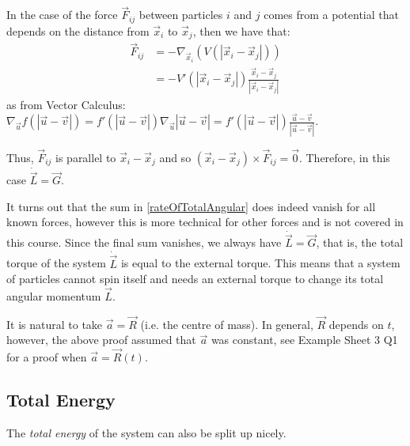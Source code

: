 \documentclass[../main.tex]{subfiles}
\begin{document}
In the case of the force $\vec{F}_{i j}$ between particles $i$ and $j$ comes from a potential that depends on the distance from $\vec{x}_i$ to $\vec{x}_j$, then we have that:
\begin{align*}
  \vec{F}_{i j} &= -\nabla_{\vec{x}_i} (V(|\vec{x}_i - \vec{x}_j|)) \\
                &= -V' (|\vec{x}_i - \vec{x}_j|) \frac{\vec{x}_i - \vec{x}_j}{|\vec{x}_i - \vec{x}_j|}
\end{align*}
as from Vector Calculus: $\nabla_{\vec{u}} f(|\vec{u} - \vec{v}|) = f'(|\vec{u} - \vec{v}|) \nabla_{\vec{u}} |\vec{u} - \vec{v}| = f'(|\vec{u} - \vec{v}|) \frac{\vec{u} - \vec{v}}{|\vec{u} - \vec{v}|}$.

Thus, $\vec{F}_{i j}$ is parallel to $\vec{x}_i - \vec{x}_j$ and so $(\vec{x}_i - \vec{x}_j) \times \vec{F}_{i j} = \vec{0}$.
Therefore, in this case $\dot{\vec{L}} = \vec{G}$.

It turns out that the sum in \cref{rateOfTotalAngular} does indeed vanish for all known forces, however this is more technical for other forces and is not covered in this course.
Since the final sum vanishes, we always have $\dot{\vec{L}} = \vec{G}$, that is, the total torque of the system $\dot{\vec{L}}$ is equal to the external torque.
This means that a system of particles cannot spin itself and needs an external torque to change its total angular momentum $\vec{L}$.
\begin{remark}
  It is natural to take $\vec{a} = \vec{R}$ (i.e. the centre of mass).
  In general, $\vec{R}$ depends on $t$, however, the above proof assumed that $\vec{a}$ was constant, see Example Sheet 3 Q1 for a proof when $\vec{a} = \vec{R}(t)$.
\end{remark}
\subsection{Total Energy}
The \textit{total energy} of the system can also be split up nicely.
\end{document}
